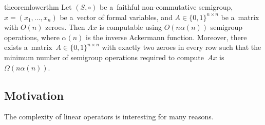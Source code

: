 \documentclass[a4paper,UKenglish,cleveref, autoref]{lipics-v2019}
\begin{document}
\begin{restatable}{theorem}{lowerthm}
\label{thm:lowerbound}
Let $(S, \circ)$ be a~faithful non-commutative semigroup, $x = (x_1,\ldots, x_n)$ be
a~vector of formal variables, and $A \in \{0,1\}^{n \times n}$
be a~matrix with $O(n)$ zeroes. Then $Ax$ is computable
using $O(n\alpha(n))$ semigroup operations, where $\alpha(n)$
is the inverse Ackermann function. Moreover, there exists
a~matrix~$A \in \{0,1\}^{n \times n}$ with exactly two zeroes
in every row such that the minimum number of semigroup
operations
required to compute~$Ax$ is $\Omega(n\alpha(n))$.
\end{restatable}


\subsection{Motivation}
The complexity of linear operators is interesting for many reasons.
\end{document}

